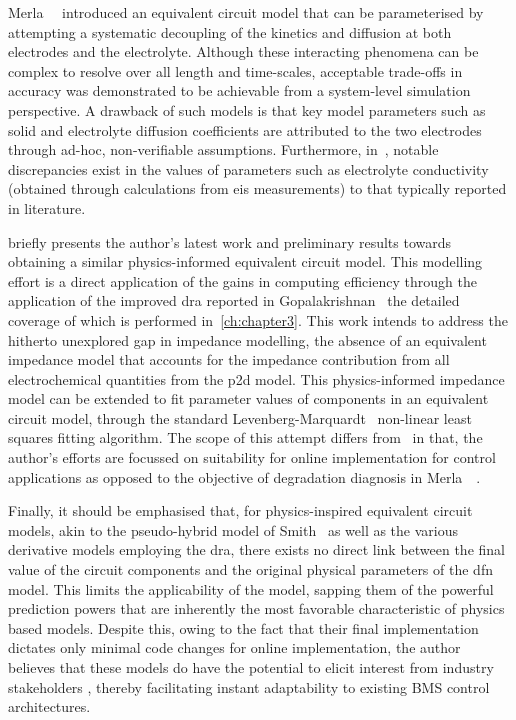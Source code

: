 Merla~\etal{}~\cite{Merla2018} introduced  an equivalent circuit model  that can
be  parameterised by  attempting a  systematic  decoupling of  the kinetics  and
diffusion at  both electrodes  and the  electrolyte. Although  these interacting
phenomena  can  be   complex  to  resolve  over  all   length  and  time-scales,
acceptable  trade-offs in  accuracy was  demonstrated  to be  achievable from  a
system-level  simulation perspective.  A drawback  of  such models  is that  key
model  parameters  such as  solid  and  electrolyte diffusion  coefficients  are
attributed  to the  two electrodes  through ad-hoc,  non-verifiable assumptions.
Furthermore, in~\cite{Merla2018},  notable discrepancies exist in  the values of
parameters  such  as  electrolyte conductivity  (obtained  through  calculations
from  \gls{eis}   measurements)  to  that  typically   reported  in  literature.

  briefly presents  the author's  latest work  and preliminary
results towards  obtaining a similar physics-informed  equivalent circuit model.
This  modelling  effort is  a  direct  application  of  the gains  in  computing
efficiency  through   the  application   of  the  improved   \gls{dra}  reported
in  Gopalakrishnan\etal{}~\cite{Gopalakrishnan2017}  the  detailed  coverage  of
which  is performed  in~\cref{ch:chapter3}.  This work  intends  to address  the
hitherto  unexplored  gap  in  impedance  modelling, \ie{}  the  absence  of  an
equivalent  impedance  model  that   accounts  for  the  impedance  contribution
from   all   electrochemical  quantities   from   the   \gls{p2d}  model.   This
physics-informed  impedance  model  can  be extended  to  fit  parameter  values
of  components  in an  equivalent  circuit  model,  \eg{} through  the  standard
Levenberg-Marquardt~\cite{Levenberg1944, Marquardt1963} non-linear least squares
fitting algorithm.  The scope of  this attempt differs  from~\cite{Merla2018} in
that, the author's efforts are focussed on suitability for online implementation
for control applications as opposed to the objective of degradation diagnosis in
Merla~\etal~\cite{Merla2018}.

Finally, it should  be emphasised that, for  physics-inspired equivalent circuit
models, akin to the pseudo-hybrid model  of Smith~\etal{} as well as the various
derivative models employing  the \gls{dra}, there exists no  direct link between
the final value  of the circuit components and the  original physical parameters
of the \gls{dfn} model. This limits the applicability of the model, sapping them
of  the  powerful prediction  powers  that  are  inherently the  most  favorable
characteristic of  physics based models.  Despite this,  owing to the  fact that
their  final  implementation  dictates  only minimal  code  changes  for  online
implementation, the author  believes that these models do have  the potential to
elicit  interest  from  industry  stakeholders ,  thereby  facilitating  instant
adaptability to existing BMS control architectures.

